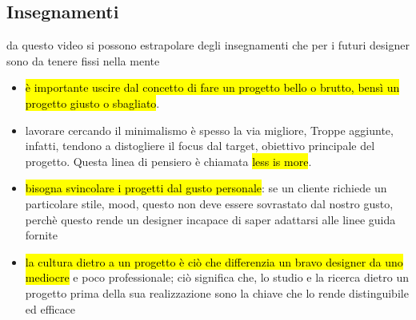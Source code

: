 \subsection{Insegnamenti}
da questo video si possono estrapolare degli insegnamenti che per i futuri designer sono da tenere fissi nella mente
\begin{itemize}
    \item \hl{è importante uscire dal concetto di fare un progetto bello o brutto, bensì un progetto giusto o sbagliato}.
    \item lavorare cercando il minimalismo è spesso la via migliore, Troppe aggiunte, infatti, tendono a distogliere il focus dal target, obiettivo principale del progetto. Questa linea di pensiero è chiamata \hl{less is more}.
    \item \hl{bisogna svincolare i progetti dal gusto personale}: se un cliente richiede un particolare stile, mood, questo non deve essere sovrastato dal nostro gusto, perchè questo rende un designer incapace di saper adattarsi alle linee guida fornite
    \item \hl{la cultura dietro a un progetto è ciò che differenzia un bravo designer da uno mediocre} e poco professionale; ciò significa che, lo studio e la ricerca dietro un progetto prima della sua realizzazione sono la chiave che lo rende distinguibile ed efficace 
\end{itemize}

